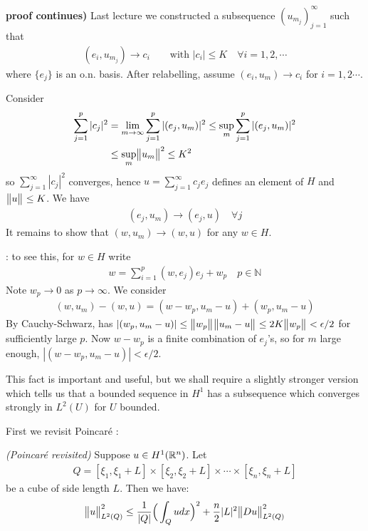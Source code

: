\documentclass[10pt,a4paper]{report}
\newenvironment{proof}
{\begin{changemargin}{1cm}{0.5cm} 
	}%
	{\end{changemargin}
}
\newenvironment{subproof}
{\begin{changemargin}{0.5cm}{0.5cm} 
	}%
	{\end{changemargin}
}
\begin{document}
\begin{proof}
\textbf{proof continues)} Last lecture we constructed a subsequence $(u_{m_j})_{j=1}^{\infty}$ such that
\begin{align*}
(e_i, u_{m_j}) \rightarrow c_i \quad\quad \text{with } |c_i| \leq K \quad \forall i=1,2,\cdots
\end{align*}
where $\{e_j \}$ is an o.n. basis. After relabelling, assume $(e_i ,u_m) \rightarrow c_i$ for $i=1,2\cdots$.
\s

Consider 
\begin{align*}
\sum_{j=1}^p |c_j|^2 &= \lim_{m\rightarrow \infty} \sum_{j=1}^p |(e_j, u_m)|^2 \leq \sup_{m} \sum_{j=1}^p |(e_j, u_m)|^2 \\
&\leq  \sup_{m} \bigl\lVert u_m\bigr\rVert_{}^2 \leq K^2
\end{align*}
so $\sum_{j=1}^{\infty} |c_j|^2$ converges, hence $u= \sum_{j=1}^{\infty} c_j e_j$ defines an element of $H$ and $\bigl\lVert u\bigr\rVert_{} \leq K$. We have
\begin{align*}
(e_j, u_m) \rightarrow (e_j, u) \quad \forall j
\end{align*}
It remains to show that $(w, u_m) \rightarrow (w,u)$ for any $w\in H$.
\begin{subproof}
: to see this, for $w\in H$ write
\begin{align*}
w= \sum_{i=1}^p (w,e_j) e_j + w_p \quad p\in \mathbb{N}
\end{align*}
Note $w_p \rightarrow 0$ as $p\rightarrow \infty$. We consider
\begin{align*}
(w,u_m) - (w,u) = (w-w_p, u_m -u) + (w_p, u_m-u)
\end{align*}
By Cauchy-Schwarz, has $|(w_p, u_m -u)| \leq \bigl\lVert w_p\bigr\rVert_{} \bigl\lVert u_m -u\bigr\rVert_{} \leq 2K \bigl\lVert w_p\bigr\rVert_{} < \epsilon/2$ for sufficiently large $p$. Now $w-w_p$ is a finite combination of $e_j$'s, so for $m$ large enough, $|(w-w_p, u_m -u)| < \epsilon/2$.
\end{subproof}

\eop
\end{proof}

This fact is important and useful, but we shall require a slightly stronger version which tells us that a bounded sequence in $H^1$ has a subsequence which converges strongly in $L^2(U)$ for $U$ bounded.
\s

First we revisit Poincar\'{e} :
\s

\lem \emph{(Poincar\'{e} revisited)} Suppose $u\in H^1(\mathbb{R}^n)$. Let
\begin{align*}
Q = [\xi_1, \xi_1 +L] \times [\xi_2, \xi_2 +L] \times \cdots \times [\xi_n, \xi_n +L]
\end{align*}
be a cube of side length $L$. Then we have:
\begin{align*}
\bigl\lVert u\bigr\rVert_{L^2(Q)}^2 \leq \frac{1}{|Q|} \Big( \int_Q udx \Big)^2 + \frac{n}{2} |L|^2 \bigl\lVert Du\bigr\rVert_{L^2(Q)}^2
\end{align*}
\s
\end{document}
